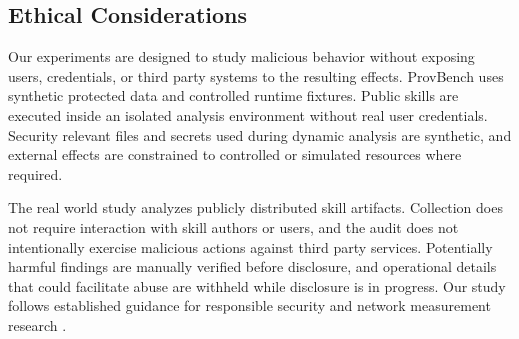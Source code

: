 \subsection{Ethical Considerations}

Our experiments are designed to study malicious behavior without exposing
users, credentials, or third party systems to the resulting effects. ProvBench
uses synthetic protected data and controlled runtime fixtures. Public skills
are executed inside an isolated analysis environment without real user
credentials. Security relevant files and secrets used during dynamic analysis
are synthetic, and external effects are constrained to controlled or simulated
resources where required.

The real world study analyzes publicly distributed skill artifacts. Collection
does not require interaction with skill authors or users, and the audit does
not intentionally exercise malicious actions against third party services.
Potentially harmful findings are manually verified before disclosure, and
operational details that could facilitate abuse are withheld while disclosure
is in progress. Our study follows established guidance for responsible
security and network measurement research
\cite{menlo,ethical}.